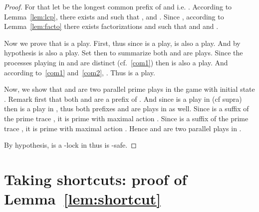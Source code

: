 \documentclass[a4paper,UKenglish]{lipics-v2016}
\begin{document}
\begin{proof}
For that let  be the longest common prefix of  and  i.e. .
According to Lemma~\ref{lem:lcp},
there exists  and  such that
, 
and  .
Since ,
according to Lemma~\ref{lem:facto}
 there exists factorizations
 and  such that
 and 
and
.

Now we prove that  is a play.
First,  thus since  is a play,
 is also a play.
And by hypothesis  is also a play.
Set  then to summarize both  and  are plays.
Since the processes playing in  and  are distinct
(cf.~\eqref{com1})
then  is also a play.
And according to~\eqref{com1} and~\eqref{com2},
.
Thus  is a play.

Now, we show that  and 
are two parallel prime plays in the game
 with initial state .
Remark first that both  and  are a prefix 
of .
And since  is a play in  (cf supra)
then  is a play in ,
thus both prefixes  and  are plays in  as well.
Since  is a suffix of the prime trace , it is prime with maximal action .
Since  is a suffix of the prime trace ,
it is prime with maximal action .
Hence  and  are two parallel plays in .

By hypothesis,  is a -lock in 
thus  is -safe.
\end{proof}



\section{Taking shortcuts: proof of Lemma~\ref{lem:shortcut}}
\end{document}
